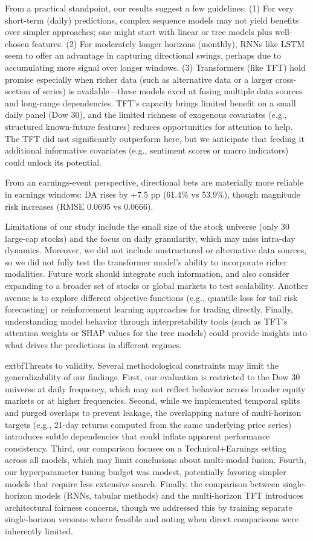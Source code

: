 \documentclass[10pt,twocolumn]{article}
\begin{document}
From a practical standpoint, our results suggest a few guidelines: (1) For very short-term (daily) predictions, complex sequence models may not yield benefits over simpler approaches; one might start with linear or tree models plus well-chosen features. (2) For moderately longer horizons (monthly), RNNs like LSTM seem to offer an advantage in capturing directional swings, perhaps due to accumulating more signal over longer windows. (3) Transformers (like TFT) hold promise especially when richer data (such as alternative data or a larger cross-section of series) is available---these models excel at fusing multiple data sources and long-range dependencies. TFT's capacity brings limited benefit on a small daily panel (Dow 30), and the limited richness of exogenous covariates (e.g., structured known-future features) reduces opportunities for attention to help. The TFT did not significantly outperform here, but we anticipate that feeding it additional informative covariates (e.g., sentiment scores or macro indicators) could unlock its potential. 

From an earnings-event perspective, directional bets are materially more reliable in earnings windows: DA rises by +7.5 pp (61.4\% vs 53.9\%), though magnitude risk increases (RMSE 0.0695 vs 0.0666). 

Limitations of our study include the small size of the stock universe (only 30 large-cap stocks) and the focus on daily granularity, which may miss intra-day dynamics. Moreover, we did not include unstructured or alternative data sources, so we did not fully test the transformer model's ability to incorporate richer modalities. Future work should integrate such information, and also consider expanding to a broader set of stocks or global markets to test scalability. Another avenue is to explore different objective functions (e.g., quantile loss for tail risk forecasting) or reinforcement learning approaches for trading directly. Finally, understanding model behavior through interpretability tools (such as TFT's attention weights or SHAP values for the tree models) could provide insights into what drives the predictions in different regimes.

	extbf{Threats to validity.} Several methodological constraints may limit the generalizability of our findings. First, our evaluation is restricted to the Dow 30 universe at daily frequency, which may not reflect behavior across broader equity markets or at higher frequencies. Second, while we implemented temporal splits and purged overlaps to prevent leakage, the overlapping nature of multi-horizon targets (e.g., 21-day returns computed from the same underlying price series) introduces subtle dependencies that could inflate apparent performance consistency. Third, our comparison focuses on a Technical+Earnings setting across all models, which may limit conclusions about multi-modal fusion. Fourth, our hyperparameter tuning budget was modest, potentially favoring simpler models that require less extensive search. Finally, the comparison between single-horizon models (RNNs, tabular methods) and the multi-horizon TFT introduces architectural fairness concerns, though we addressed this by training separate single-horizon versions where feasible and noting when direct comparisons were inherently limited.
\end{document}
